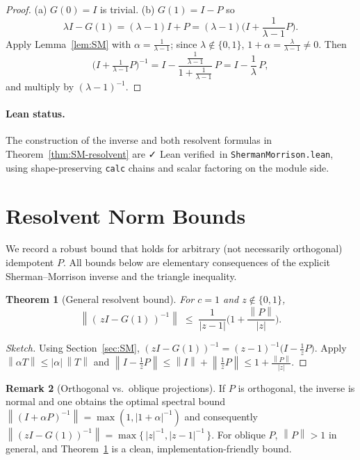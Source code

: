\documentclass[11pt]{article}
\newtheorem{theorem}{Theorem}[section]
\theoremstyle{definition}
\newtheorem{remark}[theorem]{Remark}
\newcommand{\norm}[1]{\left\lVert #1\right\rVert}
\newcommand{\leanok}{\textsf{\small \textcolor{green!60!black}{✓ Lean verified}}}
\begin{document}
\begin{proof}
(a) $G(0)=I$ is trivial. (b) $G(1)=I-P$ so
\[
\lambda I - G(1)=(\lambda-1)I+P=(\lambda-1)\Big(I + \frac{1}{\lambda-1}P\Big).
\]
Apply Lemma~\ref{lem:SM} with $\alpha=\frac{1}{\lambda-1}$; since $\lambda\notin\{0,1\}$, $1+\alpha=\frac{\lambda}{\lambda-1}\neq 0$. Then
\[
\big(I+\tfrac{1}{\lambda-1}P\big)^{-1}
= I - \frac{\frac{1}{\lambda-1}}{1+\frac{1}{\lambda-1}}\,P
= I - \frac{1}{\lambda}\,P,
\]
and multiply by $(\lambda-1)^{-1}$.
\end{proof}

\paragraph{Lean status.} The construction of the inverse and both resolvent formulas in Theorem~\ref{thm:SM-resolvent} are \leanok\ in \texttt{ShermanMorrison.lean}, using shape-preserving \texttt{calc} chains and scalar factoring on the module side.

\section{Resolvent Norm Bounds}\label{sec:norms}

We record a robust bound that holds for arbitrary (not necessarily orthogonal) idempotent $P$.
All bounds below are elementary consequences of the explicit Sherman--Morrison inverse and the triangle inequality.

\begin{theorem}[General resolvent bound]\label{thm:bound-general}
For $c=1$ and $z\notin\{0,1\}$,
\[
\norm{(\,zI - G(1)\,)^{-1}} \;\le\; \frac{1}{|z-1|}\Big(1 + \frac{\norm{P}}{|z|}\Big).
\]
\end{theorem}

\begin{proof}[Sketch]
Using Section~\ref{sec:SM}, $(zI - G(1))^{-1}=(z-1)^{-1}\big(I - \frac{1}{z}P\big)$. Apply $\norm{\alpha T}\le |\alpha|\,\norm{T}$ and $\norm{I - \frac{1}{z}P}\le \norm{I} + \norm{\frac{1}{z}P}\le 1 + \frac{\norm{P}}{|z|}$.
\end{proof}

\begin{remark}[Orthogonal vs.\ oblique projections]
If $P$ is orthogonal, the inverse is normal and one obtains the optimal spectral bound
\(
\norm{(I+\alpha P)^{-1}}=\max(1,|1+\alpha|^{-1})
\)
and consequently
\(
\norm{(zI-G(1))^{-1}}=\max\{\,|z|^{-1},|z-1|^{-1}\,\}.
\)
For oblique $P$, $\norm{P}>1$ in general, and Theorem~\ref{thm:bound-general} is a clean, implementation-friendly bound.
\end{remark}
\end{document}
